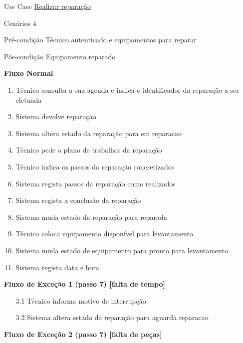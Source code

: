 \documentclass[../relatorio.tex]{subfiles}
\begin{document}
\begin{itemize}
    \item[Use Case] {\underline{Realizar reparação}}
    \item[Cenários] {4}
    \item[Pré-condição] {Técnico autenticado e equipamentos para reparar}
    \item[Pós-condição] {Equipamento reparado}
          \begin{flushleft}
              \textbf{Fluxo Normal}
          \end{flushleft}
          \begin{enumerate}
              \item Técnico consulta a sua agenda e indica o identificador da reparação a ser efetuada
              \item Sistema devolve reparação
              \item Sistema altera estado da reparação para em reparacao
              \item Técnico pede o plano de trabalhos da reparação
              \item Técnico indica os passos da reparação concretizados
              \item Sistema regista passos da reparação como realizados
              \item Sistema regista a conclusão da reparação
              \item Sistema muda estado da reparação para reparada
              \item Técnico coloca equipamento disponível para levantamento
              \item Sistema muda estado de equipamento para pronto para levantamento
              \item Sistema regista data e hora
          \end{enumerate}
          \begin{flushleft}
              \textbf{Fluxo de Exceção 1 (passo 7) [falta de tempo]}
          \end{flushleft}
          \begin{itemize}
              \item[3.1]{Técnico informa motivo de interrupção}
              \item[3.2]{Sistema altera estado da reparação para aguarda reparacao}
          \end{itemize}
          \begin{flushleft}
              \textbf{Fluxo de Exceção 2 (passo 7) [falta de peças]}

\end{flushleft}
\end{itemize}
\end{document}
